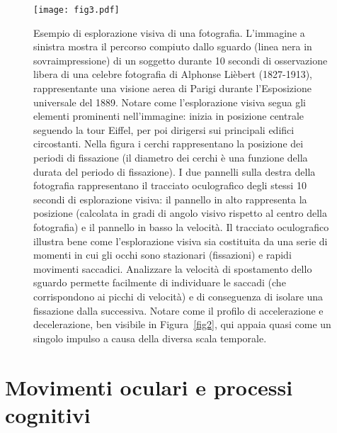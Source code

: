 \documentclass[12pt]{article}
\begin{document}
\begin{figure}
\centering
\texttt{[image: fig3.pdf]}
\caption{Esempio di esplorazione visiva di una fotografia. L'immagine a sinistra mostra il percorso compiuto dallo sguardo (linea nera in sovraimpressione) di un soggetto durante 10 secondi di osservazione libera di una celebre fotografia di Alphonse Lièbert (1827-1913), rappresentante una visione aerea di Parigi durante l'Esposizione universale del 1889. Notare come l'esplorazione visiva segua gli elementi prominenti nell'immagine: inizia in posizione centrale seguendo la tour Eiffel, per poi dirigersi sui principali edifici circostanti. Nella figura i cerchi rappresentano la posizione dei periodi di fissazione (il diametro dei cerchi è una funzione della durata del periodo di fissazione). I due pannelli sulla destra della fotografia rappresentano il tracciato oculografico degli stessi 10 secondi di esplorazione visiva: il pannello in alto rappresenta la posizione (calcolata in gradi di angolo visivo rispetto al centro della fotografia) e il pannello in basso la velocità. Il tracciato oculografico illustra bene come l'esplorazione visiva sia costituita da una serie di momenti in cui gli occhi sono stazionari (fissazioni) e rapidi movimenti saccadici. Analizzare la velocità di spostamento dello sguardo permette facilmente di individuare le saccadi (che corrispondono ai picchi di velocità) e di conseguenza di isolare una fissazione dalla successiva. Notare come il profilo di accelerazione e decelerazione, ben visibile in Figura~\ref{fig2}, qui appaia quasi come un singolo impulso a causa della diversa scala temporale.}
\label{fig3}
\end{figure}

\break
\section{Movimenti oculari e processi cognitivi}
\end{document}
